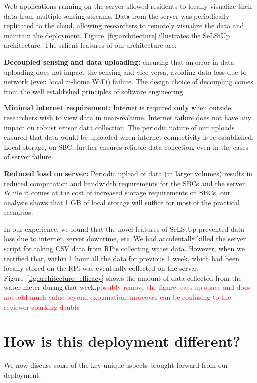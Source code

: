 \documentclass[10pt]{sensys-proc}
\newcommand{\redcolor}[1]{\textcolor{red}{#1}}
\newcommand{\figref}[1]{Figure~\ref{#1}}
\newcommand{\selstups}{SeLStUp }
\begin{document}
Web applications running on the server allowed residents to locally visualize their data from multiple sensing streams. Data from the server was periodically replicated to the cloud, allowing researchers to remotely visualize the data and maintain the deployment. \figref{fig:architecture} illustrates the \selstups architecture. The salient features of our architecture are:


\noindent \textbf{Decoupled sensing and data uploading:} ensuring that an error in data uploading does not impact the sensing and vice versa, avoiding data loss due to network (even local in-home WiFi) failure. The design choice of decoupling comes from the well established principles of software engineering.

\noindent \textbf{Minimal internet requirement:} Internet is required \textbf{only} when outside researchers wish to view data in near-realtime. Internet failure does not have any impact on robust sensor data collection. The periodic nature of our uploads ensured that data would be uploaded when internet connectivity is re-established. Local storage, on SBC, further ensures reliable data collection, even in the cases of server failure. %

\noindent \textbf{Reduced load on server:} Periodic upload of data (in larger volumes) results in reduced computation and bandwidth requirements for the SBCs and the server. While it comes at the cost of increased storage requirements on SBCs, our analysis shows that 1 GB of local storage will suffice for most of the practical scenarios. %

In our experience, we found that the novel features of \selstups prevented data loss due to internet, server downtime, etc. We had accidentally killed the server script for taking CSV data from RPis collecting water data. However, when we rectified that, within 1 hour all the data for previous 1 week, which had been locally stored on the RPi was eventually collected on the server. \figref{fig:architecture_efficacy} shows the amount of data collected from the water meter during that week.\redcolor{possibly remove the figure, eats up space and does not add much value beyond explanation; moreover can be confusing to the reviewer sparking doubts}



\section{How is this deployment different?}
\label{sec:learning}
We now discuss some of the key unique aspects brought forward from our deployment. 
\end{document}
